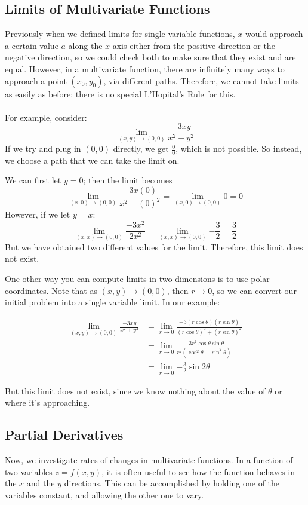 \documentclass[12pt]{article}
\begin{document}
\subsection{Limits of Multivariate Functions}
Previously when we defined limits for single-variable functions, $x$ would approach a certain value $a$ along the $x$-axis either from the positive direction or the negative direction, so we could check both to make sure that they exist and are equal. However, in a multivariate function, there are infinitely many ways to approach a point $(x_0,y_0)$, via different paths. Therefore, we cannot take limits as easily as before; there is no special L'Hopital's Rule for this. \\ \\
For example, consider:
\[ \lim_{(x,y) \rightarrow (0,0)}{\frac{-3xy}{x^2+y^2}} \]
If we try and plug in $(0,0)$ directly, we get $\frac{0}{0}$, which is not possible. So instead, we choose a path that we can take the limit on.

We can first let $y=0$; then the limit becomes \[ \lim_{(x,0) \rightarrow (0,0)}{\frac{-3x(0)}{x^2+(0)^2}} = \lim_{(x,0) \rightarrow (0,0)}{0} = 0 \]
However, if we let $y = x$: \[ \lim_{(x,x) \rightarrow (0,0)}{\frac{-3x^2}{2x^2}} = \lim_{(x,x) \rightarrow (0,0)}{-\frac{3}{2}} = \frac{3}{2} \]
But we have obtained two different values for the limit. Therefore, this limit does not exist.

One other way you can compute limits in two dimensions is to use polar coordinates. Note that as $(x,y) \rightarrow (0,0)$, then $r \rightarrow 0$, so we can convert our initial problem into a single variable limit. In our example:

\[ 
\begin{aligned}
\lim_{(x,y) \rightarrow (0,0)}{\frac{-3xy}{x^2+y^2}} &= \lim_{r \rightarrow 0}{\frac{-3(r\cos{\theta})(r\sin{\theta})}{(r\cos{\theta})^2 + (r\sin{\theta})^2}} \\
&= \lim_{r \rightarrow 0}{\frac{-3r^2\cos{\theta}\sin{\theta}}{r^2(\cos^2{\theta} + \sin^2{\theta})}} \\
&= \lim_{r \rightarrow 0}{-\frac{3}{2}\sin{2\theta}} 
\end{aligned}
\]

But this limit does not exist, since we know nothing about the value of $\theta$ or where it's approaching.

\subsection{Partial Derivatives}
Now, we investigate rates of changes in multivariate functions. In a function of two variables $z = f(x,y)$, it is often useful to see how the function behaves in the $x$ and the $y$ directions. This can be accomplished by holding one of the variables constant, and allowing the other one to vary. 
\end{document}

